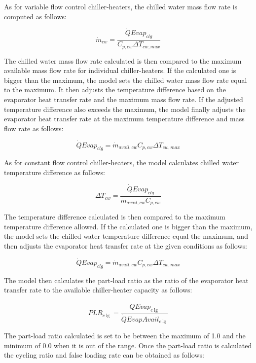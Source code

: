 As for variable flow control chiller-heaters, the chilled water mass flow rate is computed as follows:

\begin{equation}
{\dot m_{cw}} = \frac{{\dot QEva{p_{clg}}}}{{{C_{p,cw}}\Delta {T_{cw,max}}}}
\end{equation}

The chilled water mass flow rate calculated is then compared to the maximum available mass flow rate for individual chiller-heaters. If the calculated one is bigger than the maximum, the model sets the chilled water mass flow rate equal to the maximum. It then adjusts the temperature difference based on the evaporator heat transfer rate and the maximum mass flow rate. If the adjusted temperature difference also exceeds the maximum, the model finally adjusts the evaporator heat transfer rate at the maximum temperature difference and mass flow rate as follows:

\begin{equation}
\dot QEva{p_{clg}} = {\dot m_{avail,cw}}{C_{p,cw}}\Delta {T_{cw,max}}
\end{equation}

As for constant flow control chiller-heaters, the model calculates chilled water temperature difference as follows:

\begin{equation}
\Delta {T_{cw}} = \frac{{\dot QEva{p_{clg}}}}{{{{\dot m}_{avail,cw}}{C_{p,cw}}}}
\end{equation}

The temperature difference calculated is then compared to the maximum temperature difference allowed. If the calculated one is bigger than the maximum, the model sets the chilled water temperature difference equal the maximum, and then adjusts the evaporator heat transfer rate at the given conditions as follows:

\begin{equation}
\dot QEva{p_{clg}} = {\dot m_{avail,cw}}{C_{p,cw}}\Delta {T_{cw,max}}
\end{equation}

The model then calculates the part-load ratio as the ratio of the evaporator heat transfer rate to the available chiller-heater capacity as follows:

\begin{equation}
PL{R_{c\lg }} = \frac{{\dot QEva{p_{c\lg }}}}{{\dot QEvapAvai{l_{c\lg }}}}
\end{equation}

The part-load ratio calculated is set to be between the maximum of 1.0 and the minimum of 0.0 when it is out of the range. Once the part-load ratio is calculated the cycling ratio and false loading rate can be obtained as follows:

